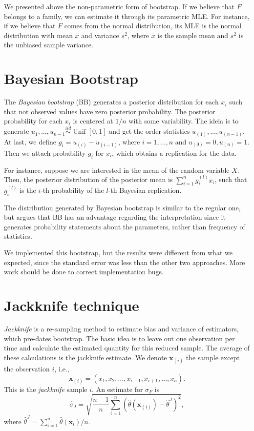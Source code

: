\documentclass[a4paper,10pt, notitlepage]{report}
\begin{document}
We presented above the non-parametric form of bootstrap. If we believe that
$F$ belongs to a family, we can estimate it through its parametric MLE. For
instance, if we believe that $F$ comes from the normal distribution, its MLE
is the normal distribution with mean $\bar{x}$ and variance $s^2$, where
$\bar{x}$ is the sample mean and $s^2$ is the unbiased sample variance. 

\section*{Bayesian Bootstrap}

The {\em Bayesian bootstrap} (BB) generates a posterior distribution for
each $x_i$ such that not observed values have zero posterior probability. The 
posterior probability for each $x_i$ is centered at $1/n$ with some
variability. The ideia is to generate $u_1, \dots, u_{n-1} \overset{iid}{\sim}
\operatorname{Unif}[0,1]$ and get the order statistics $u_{(1)}, \dots,
u_{(n-1)}$. At last, we define $g_i = u_{(i)} - u_{(i-1)}$, where
$i=1,\dots,n$ and $u_{(0)} = 0, u_{(n)} = 1$. Then we attach probability $g_i$
for $x_i$, which obtains a replication for the data. 

For instance, suppose we are interested in the mean of the random variable
$X$. Then, the posterior distribution of the posterior mean is $\sum_{i=1}^n
g_i^{(l)} x_i$, such that $g_i^{(l)}$ is the $i$-th probability of the $l$-th
Bayesian replication.

The distribution generated by Bayesian bootstrap is similar to the regular
one, but \cite{rubin1981bayesian} argues that BB has an advantage regarding
the interpretation since it generates probability statements about the
parameters, rather than frequency of statistics.

We implemented this bootstrap, but the results were different from what we
expected, since the standard error was less than the other two approaches.
More work should be done to correct implementation bugs.

\section*{Jackknife technique}

{\em Jackknife} is a re-sampling method to estimate bias and variance of estimators,
which pre-dates bootstrap. The basic idea is to leave out one observation per
time and calculate the estimated quantity for this reduced sample. The average of
these calculations is the jackknife estimate. We denote $\boldsymbol{x}_{(i)}$
the sample except the observation $i$, i.e., 
$$
\boldsymbol{x}_{(i)} = (x_1, x_2, \dots, x_{i-1}, x_{i+1}, \dots, x_n).
$$
This is the {\em jackknife} sample $i$. An estimate for $\sigma_F$ is 
$$
\hat{\sigma}_J = \sqrt{\frac{n-1}{n}\sum_{i=1}^n (\hat{\theta}(\boldsymbol{x}_{(i)}) - \hat{\theta}^J)^2}, 
$$
where $\hat{\theta}^J = \sum_{i=1}^n \hat{\theta}(\boldsymbol{x}_i)/n$.
\end{document}
